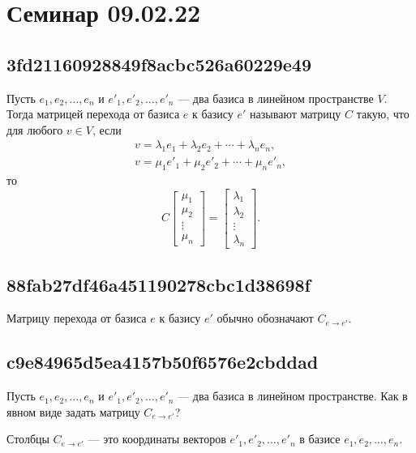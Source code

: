 \documentclass[11pt, a5paper]{article}
\let\oldsection\section
\renewcommand\section{\pagebreak\oldsection}
\newenvironment{note}[1]{\goodbreak\par\subsection{\hfill \color{lightgray}\tiny #1}}{}
\newenvironment{cloze}[2][\ldots]{\begin{leftbar}}{\end{leftbar}}
\newenvironment{icloze}[2][\ldots]{%
  \ignorespaces\text{\tiny \color{lightgray} \{\{c#2::}\hspace{0pt}%
}{%
  \hspace{0pt}\text{\tiny \color{lightgray}\}\}}\unskip%
}
\begin{document}
\section{Семинар 09.02.22}
\begin{note}{3fd21160928849f8acbc526a60229e49}
    Пусть \( e_1, e_2, \ldots, e_n \) и \( e'_1, e'_2, \ldots, e'_n \) --- два базиса в линейном пространстве \( V \).
    Тогда \begin{icloze}{2}матрицей перехода от базиса \( e \) к базису \( e' \)\end{icloze} называют
    \begin{icloze}{1}матрицу \( C \) такую, что для любого \( v \in V \), если
    \[
        \begin{gathered}
            v = \lambda_1 e_1 + \lambda_2 e_2 + \cdots + \lambda_n e_n, \\
            v = \mu_1 e'_1 + \mu_2 e'_2 + \cdots + \mu_n e'_n,
        \end{gathered}
    \]
    то
    \[
        C \begin{bmatrix}
            \mu_1 \\ \mu_2 \\ \vdots \\ \mu_n
        \end{bmatrix}
        =
        \begin{bmatrix}
            \lambda_1 \\ \lambda_2 \\ \vdots \\ \lambda_n
        \end{bmatrix}.
    \]
\end{icloze}
\end{note}

\begin{note}{88fab27df46a451190278cbc1d38698f}
    \begin{icloze}{2}Матрицу перехода от базиса \( e \) к базису \( e' \)\end{icloze} обычно обозначают \begin{icloze}{1}\( C_{e \to e'}  \).\end{icloze}
\end{note}

\begin{note}{c9e84965d5ea4157b50f6576e2cbddad}
    Пусть \( e_1, e_2, \ldots, e_n \) и \( e'_1, e'_2, \ldots, e'_n \) --- два базиса в линейном пространстве.
    Как в явном виде задать матрицу \( C_{e \to e'} \)?

    \begin{cloze}{1}
        Столбцы \( C_{e \to e'} \) --- это координаты векторов \( e'_1, e'_2, \ldots, e'_n \) в базисе \( e_1, e_2, \ldots, e_n \).
    \end{cloze}
\end{note}
\end{document}
